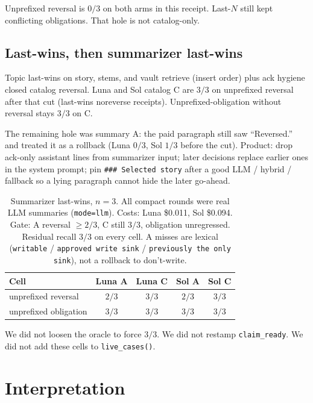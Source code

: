 \documentclass[11pt]{article}
\newcommand{\arm}[1]{\textsf{#1}}
\begin{document}
Unprefixed reversal is $0/3$ on both arms in this receipt. Last-$N$
still kept conflicting obligations. That hole is not catalog-only.

\subsection{Last-wins, then summarizer last-wins}
\label{sec:lw-results}

Topic last-wins on story, stems, and vault retrieve (insert order)
plus ack hygiene closed catalog reversal. Luna and Sol catalog
\arm{C} are $3/3$ on unprefixed reversal after that cut
(last-wins noreverse receipts). Unprefixed-obligation
without reversal stays $3/3$ on \arm{C}.

The remaining hole was summary \arm{A}: the paid paragraph still saw
``Reversed.'' and treated it as a rollback (Luna $0/3$, Sol $1/3$
before the cut). Product: drop ack-only assistant lines from
summarizer input; later decisions replace earlier ones in the system
prompt; pin \texttt{\#\#\# Selected story} after a good LLM / hybrid /
fallback so a lying paragraph cannot hide the later go-ahead.

\begin{table}[ht]
\centering
\caption{Summarizer last-wins, $n{=}3$. All compact rounds were real
LLM summaries (\texttt{mode=llm}). Costs: Luna \$0.011, Sol \$0.094.
Gate: \arm{A} reversal ${\ge}2/3$, \arm{C} still $3/3$, obligation
unregressed. Residual recall $3/3$ on every cell. \arm{A} misses are
lexical (\texttt{writable} / \texttt{approved write sink} /
\texttt{previously the only sink}), not a rollback to don't-write.}
\label{tab:sumlw}
\begin{tabular}{@{}lcccc@{}}
\toprule
Cell & Luna \arm{A} & Luna \arm{C} & Sol \arm{A} & Sol \arm{C} \\
\midrule
unprefixed reversal & $2/3$ & $3/3$ & $2/3$ & $3/3$ \\
unprefixed obligation & $3/3$ & $3/3$ & $3/3$ & $3/3$ \\
\bottomrule
\end{tabular}
\end{table}

We did not loosen the oracle to force $3/3$. We did not restamp
\texttt{claim\_ready}. We did not add these cells to
\texttt{live\_cases()}.

\section{Interpretation}
\label{sec:interp}
\end{document}
